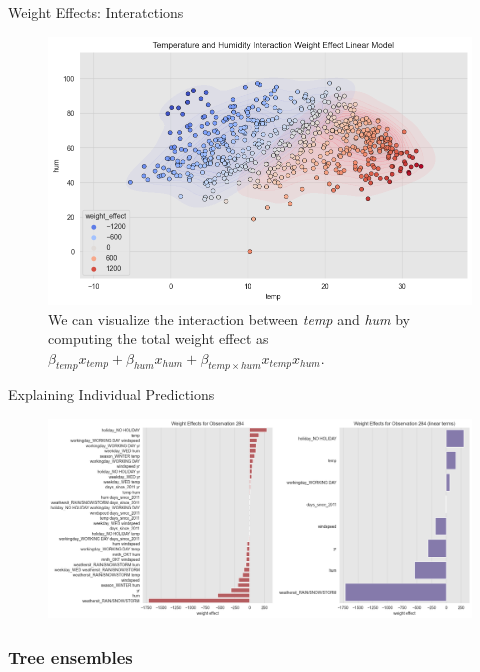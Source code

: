 \documentclass[10pt]{beamer}
\begin{document}
\begin{frame}{Weight Effects: Interatctions}
\begin{center}
  \begin{figure}
    \includegraphics[scale=0.48]{images/interpretable_ml_68_0.png}
    \caption{
      We can visualize the interaction between {\em temp} and {\em hum} by computing the total weight effect as $\beta_{temp}x_{temp} + \beta_{hum}x_{hum} + \beta_{temp \times hum}x_{temp}x_{hum}$.
    }
  \end{figure}
\end{center}
\end{frame}

\begin{frame}{Explaining Individual Predictions}
\begin{center}
  \begin{figure}
    \includegraphics[scale=0.3]{images/interpretable_ml_72_0.png}
  \end{figure}
\end{center}
\end{frame}

\subsubsection{Tree ensembles}
\end{document}
